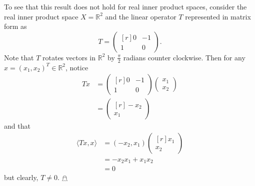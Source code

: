 \documentclass{article}
\newcommand{\inp}[2]{\langle #1, #2 \rangle}
\begin{document}
\begin{itemize}
    To see that this result does not hold for real inner product spaces, consider the real inner product space $X = \mathbb{R}^2$ and the linear operator $T$ represented in matrix form as
    \[T = \begin{pmatrix*}[r]
        0 & -1\\
        1 & 0
    \end{pmatrix*}.\]
    Note that $T$ rotates vectors in $\mathbb{R}^2$ by $\tfrac{\pi}{2}$ radians counter clockwise. Then for any $x = (x_1,x_2)^T \in \mathbb{R}^2$, notice
    \begin{align*}
        Tx &= \begin{pmatrix*}[r]
            0 & -1\\
            1 & 0
        \end{pmatrix*}\begin{pmatrix}
            x_1\\
            x_2
        \end{pmatrix}\\
        &= \begin{pmatrix*}[r]
            -x_2\\
            x_1
        \end{pmatrix*}
    \end{align*}
    and that 
    \begin{align*}
        \inp{Tx}{x} &= (-x_2,x_1)\begin{pmatrix*}[r]
            x_1\\
            x_2
        \end{pmatrix*}\\
        &= -x_2x_1 + x_1x_2\\
        &= 0
    \end{align*}
    but clearly, $T \neq 0$. \hfill $\mathghost$
    
    
\end{itemize}
\end{document}
